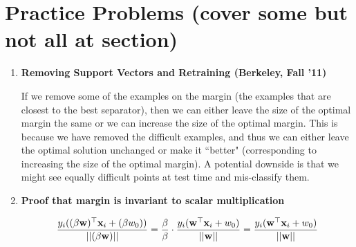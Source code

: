 \documentclass[11pt,letterpaper]{article}
\begin{document}
\section{Practice Problems (cover some but not all at section)}
\begin{enumerate}

\item {\bf Removing Support Vectors and Retraining (Berkeley, Fall '11)}\\

\begin{solution}
\vspace{\baselineskip}
If we remove some of the examples on the margin
(the examples that are closest to the best separator), then we can
either leave the size of the optimal margin the same or we can
increase the size of the optimal margin. 
This is because we have removed the difficult examples, and thus we can either
leave the optimal solution unchanged or make it ``better" (corresponding to increasing 
the size of the optimal margin). A potential downside is that we might see
equally difficult points at test time and mis-classify them.
\vspace{\baselineskip}

\end{solution}


\item {\bf Proof that margin is invariant to scalar 
multiplication}\\

\begin{solution}

\vspace{\baselineskip}

$$
 \frac{y_i((\beta\mathbf{w})^\top \mathbf{x}_i + (\beta w_0))}{|| (\beta \mathbf{w}) ||}= \frac{\beta}{\beta} \cdot \frac{y_i(\mathbf{w}^\top \mathbf{x}_i+w_0)}{|| \mathbf{w} ||}   =\frac{y_i(\mathbf{w}^\top \mathbf{x}_i+w_0)}{|| \mathbf{w} ||} $$


\end{solution}
\end{enumerate}
\end{document}
